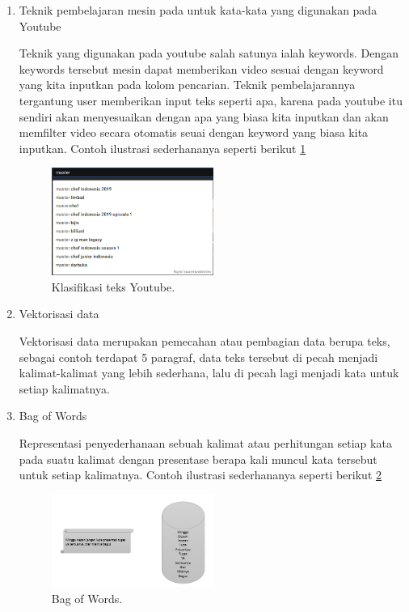 \begin{enumerate}
\item Teknik pembelajaran mesin pada untuk kata-kata yang digunakan pada Youtube \par
Teknik yang digunakan pada youtube salah satunya ialah keywords. Dengan keywords tersebut mesin dapat memberikan video sesuai dengan keyword yang kita inputkan pada kolom pencarian. Teknik pembelajarannya tergantung user memberikan input teks seperti apa, karena pada youtube itu sendiri akan menyesuaikan dengan apa yang biasa kita inputkan dan akan memfilter video secara otomatis seuai dengan keyword yang biasa kita inputkan. Contoh ilustrasi sederhananya seperti berikut \ref{Teks3}
		\begin{figure}[ht]
		\centerline{\includegraphics[width=0.5\textwidth]{figures/im/teks3.png}}
		\caption{Klasifikasi teks Youtube.}
		\label{Teks3}
		\end{figure}

\item Vektorisasi data \par
Vektorisasi data merupakan pemecahan atau pembagian data berupa teks, sebagai contoh terdapat 5 paragraf, data teks tersebut di pecah menjadi kalimat-kalimat yang lebih sederhana, lalu di pecah lagi menjadi kata untuk setiap kalimatnya. 

\item Bag of Words \par
Representasi penyederhanaan sebuah kalimat atau perhitungan setiap kata pada suatu kalimat dengan presentase berapa kali muncul kata tersebut untuk setiap kalimatnya. Contoh ilustrasi sederhananya seperti berikut \ref{Teks5}
		\begin{figure}[ht]
		\centerline{\includegraphics[width=0.5\textwidth]{figures/im/teks5.png}}
		\caption{Bag of Words.}
		\label{Teks5}
		\end{figure}


\end{enumerate}
